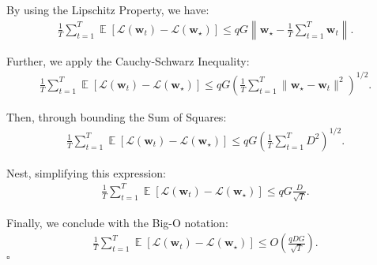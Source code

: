 \documentclass[letterpaper]{article}
\newcommand{\E}{\mathop{\mathbb{E}}}
\renewcommand{\L}{\mathcal{L}}
\newcommand{\bw}{\mathbf{w}}
\renewcommand{\qedsymbol}{\hfill $\square$}
\begin{document}
\begin{enumerate}
	By using the Lipschitz Property, we have:
	\begin{equation}
		\begin{aligned}
			\frac{1}{T}\sum_{t=1}^T \E[\L(\bw_t)-\L(\bw_\star)] \leq q G \left\|\bw_\star - \frac{1}{T}\sum_{t=1}^T \bw_t\right\|.
		\end{aligned}
	\end{equation}
	
	Further, we apply the Cauchy-Schwarz Inequality:
	\begin{equation}
		\begin{aligned}
			\frac{1}{T}\sum_{t=1}^T \E[\L(\bw_t)-\L(\bw_\star)] \leq q G \left(\frac{1}{T}\sum_{t=1}^T \|\bw_\star - \bw_t\|^2\right)^{1/2}.
		\end{aligned}
	\end{equation}
	
	Then, through bounding the Sum of Squares:
	\begin{equation}
		\begin{aligned}
			\frac{1}{T}\sum_{t=1}^T \E[\L(\bw_t)-\L(\bw_\star)] \leq q G \left(\frac{1}{T}\sum_{t=1}^T D^2\right)^{1/2}.
		\end{aligned}
	\end{equation}
	
	Nest, simplifying this expression:
	\begin{equation}
		\begin{aligned}
			\frac{1}{T}\sum_{t=1}^T \E[\L(\bw_t)-\L(\bw_\star)] \leq q G \frac{D}{\sqrt{T}}.
		\end{aligned}
	\end{equation}
	
	Finally, we conclude with the Big-O notation:
	\begin{equation}
		\begin{aligned}
			\frac{1}{T}\sum_{t=1}^T \E[\L(\bw_t)-\L(\bw_\star)] \leq O\left(\frac{q DG}{\sqrt{T}}\right).
		\end{aligned}
	\end{equation}
	\qedsymbol
	

\end{enumerate}
\end{document}
